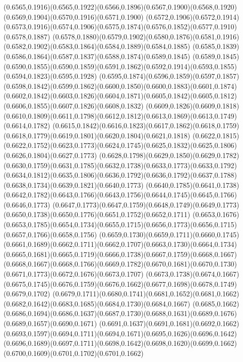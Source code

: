 (0.6565,0.1916)(0.6565,0.1922)(0.6566,0.1896)(0.6567,0.1900)(0.6568,0.1920)(0.6569,0.1904)(0.6570,0.1916)(0.6571,0.1900)
(0.6572,0.1906)(0.6572,0.1914)(0.6573,0.1916)(0.6574,0.1906)(0.6575,0.1874)(0.6576,0.1852)(0.6577,0.1910)(0.6578,0.1887)
(0.6578,0.1880)(0.6579,0.1902)(0.6580,0.1876)(0.6581,0.1916)(0.6582,0.1902)(0.6583,0.1864)(0.6584,0.1889)(0.6584,0.1885)
(0.6585,0.1839)(0.6586,0.1864)(0.6587,0.1837)(0.6588,0.1874)(0.6589,0.1845)
\PST@Solid(0.6589,0.1845)(0.6590,0.1855)(0.6590,0.1859)(0.6591,0.1862)(0.6592,0.1914)(0.6593,0.1855)(0.6594,0.1823)(0.6595,0.1928)
(0.6595,0.1874)(0.6596,0.1859)(0.6597,0.1857)(0.6598,0.1842)(0.6599,0.1862)(0.6600,0.1850)(0.6600,0.1883)(0.6601,0.1874)
(0.6602,0.1842)(0.6603,0.1826)(0.6604,0.1871)(0.6605,0.1842)(0.6605,0.1812)(0.6606,0.1855)(0.6607,0.1826)(0.6608,0.1832)
(0.6609,0.1826)(0.6609,0.1818)(0.6610,0.1809)(0.6611,0.1798)(0.6612,0.1812)(0.6613,0.1869)(0.6613,0.1749)(0.6614,0.1782)
(0.6615,0.1842)(0.6616,0.1823)(0.6617,0.1862)(0.6618,0.1759)(0.6618,0.1779)(0.6619,0.1801)(0.6620,0.1804)(0.6621,0.1818)
(0.6622,0.1815)(0.6622,0.1752)(0.6623,0.1773)(0.6624,0.1745)(0.6625,0.1832)(0.6625,0.1806)(0.6626,0.1804)(0.6627,0.1773)
(0.6628,0.1798)(0.6629,0.1850)(0.6629,0.1782)(0.6630,0.1759)(0.6631,0.1785)(0.6632,0.1738)(0.6633,0.1773)(0.6633,0.1792)
(0.6634,0.1812)(0.6635,0.1806)(0.6636,0.1792)(0.6636,0.1792)(0.6637,0.1788)(0.6638,0.1734)(0.6639,0.1821)(0.6640,0.1773)
(0.6640,0.1785)(0.6641,0.1738)(0.6642,0.1782)(0.6643,0.1766)(0.6643,0.1756)(0.6644,0.1745)(0.6645,0.1766)(0.6646,0.1773)
(0.6647,0.1773)(0.6647,0.1759)(0.6648,0.1749)(0.6649,0.1773)(0.6650,0.1738)(0.6650,0.1776)(0.6651,0.1752)(0.6652,0.1711)
(0.6653,0.1676)(0.6653,0.1785)(0.6654,0.1734)(0.6655,0.1715)(0.6656,0.1773)(0.6656,0.1715)(0.6657,0.1766)(0.6658,0.1756)
(0.6659,0.1730)(0.6659,0.1711)(0.6660,0.1745)(0.6661,0.1689)(0.6662,0.1711)(0.6662,0.1707)(0.6663,0.1730)(0.6664,0.1734)
(0.6665,0.1681)(0.6665,0.1719)(0.6666,0.1738)(0.6667,0.1759)(0.6668,0.1667)
\PST@Solid(0.6668,0.1667)(0.6668,0.1766)(0.6669,0.1782)(0.6670,0.1681)(0.6670,0.1730)(0.6671,0.1773)(0.6672,0.1676)(0.6673,0.1707)
(0.6673,0.1738)(0.6674,0.1667)(0.6675,0.1745)(0.6676,0.1759)(0.6676,0.1662)(0.6677,0.1698)(0.6678,0.1749)(0.6679,0.1702)
(0.6679,0.1711)(0.6680,0.1741)(0.6681,0.1652)(0.6681,0.1662)(0.6682,0.1642)(0.6683,0.1685)(0.6684,0.1730)(0.6684,0.1667)
(0.6685,0.1662)(0.6686,0.1694)(0.6686,0.1637)(0.6687,0.1730)(0.6688,0.1631)(0.6689,0.1676)(0.6689,0.1657)(0.6690,0.1671)
(0.6691,0.1637)(0.6691,0.1681)(0.6692,0.1662)(0.6693,0.1597)(0.6694,0.1711)(0.6694,0.1671)(0.6695,0.1626)(0.6696,0.1642)
(0.6696,0.1689)(0.6697,0.1711)(0.6698,0.1642)(0.6698,0.1620)(0.6699,0.1662)(0.6700,0.1609)(0.6701,0.1702)(0.6701,0.1662)
